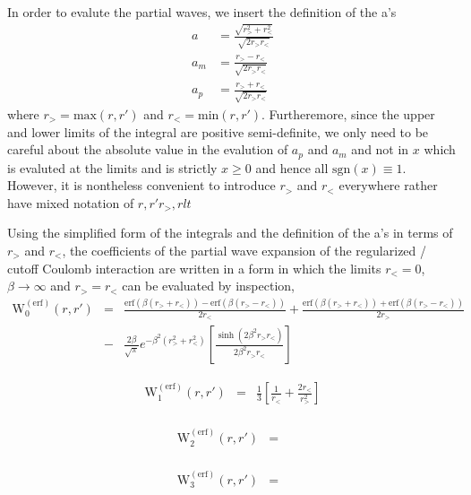 \documentclass[paper=a4, fontsize=11pt]{article} %
\numberwithin{equation}{section} %
\numberwithin{figure}{section} %
\numberwithin{table}{section} %
\newcommand{\rerf}{{\mathrm{erf}}}
\newcommand{\PWerf}{\mathrm{W}^{(\mathrm{erf})}}
\newcommand{\sgn}{\mathrm{sgn}}
\newcommand{\rgt}{r_{>}}
\newcommand{\rlt}{r_{<}}
\begin{document}
In order to evalute the partial waves, we insert the definition of the a's
\begin{equation}
\begin{split}
a   &=  \frac{\sqrt{\rgt^2+\rlt^2}}{\sqrt{2\rgt\rlt}} \\
a_m &=  \frac{\rgt - \rlt}{\sqrt{2\rgt\rlt}} \\
a_p &=  \frac{\rgt + \rlt}{\sqrt{2\rgt\rlt}} 
\end{split}
\end{equation}
where $\rgt = \mathrm{max}(r,r')$ and $\rlt = \mathrm{min}(r,r')$. 
Furtheremore, since the upper and lower limits of the integral are positive semi-definite, we only need to be careful
about the absolute value in the evalution of $a_p$ and $a_m$ and not in $x$ which is evaluted at the limits and is 
strictly $x \geq 0$ and hence all $\sgn(x)\equiv 1$.  However, it is nontheless
convenient to introduce $\rgt$ and $\rlt$ everywhere rather have mixed notation of $r,r'\rgt,rlt$

Using the simplified form of the integrals and the definition of the a's in terms of $\rgt$ and $\rlt$,
the coefficients of the partial wave expansion of the regularized / cutoff Coulomb interaction are written in
a form in which the limits $\rlt=0$, $\beta\rightarrow \infty$ and $\rgt=\rlt$ can be evaluated by inspection,
\begin{eqnarray}
\PWerf_0(r,r') &=& 
\frac{\rerf(\beta (\rgt+\rlt))-\rerf(\beta (\rgt-\rlt))}{2\rlt}
+ \frac{\rerf(\beta (\rgt+\rlt))+\rerf(\beta (\rgt-\rlt))}{2\rgt} \nonumber \\
&-& \frac{2\beta}{\sqrt{\pi}}e^{-\beta^2(\rgt^2+\rlt^2)}\left [\frac{\sinh(2\beta^2 \rgt\rlt)}{2\beta^2 \rgt\rlt}\right ]
\end{eqnarray}

\begin{eqnarray}
  \PWerf_1(r,r') &=&  
  \frac{1}{3} \left [ \frac{1}{\rlt} + \frac{2\rlt}{\rgt^2}\right ] \nonumber \\
  & & \nonumber
\end{eqnarray}

\begin{eqnarray}
\PWerf_2(r,r') &=&  \nonumber \\
\end{eqnarray}

\begin{eqnarray}
\PWerf_3(r,r') &=&  \nonumber \\
\end{eqnarray}
\end{document}
